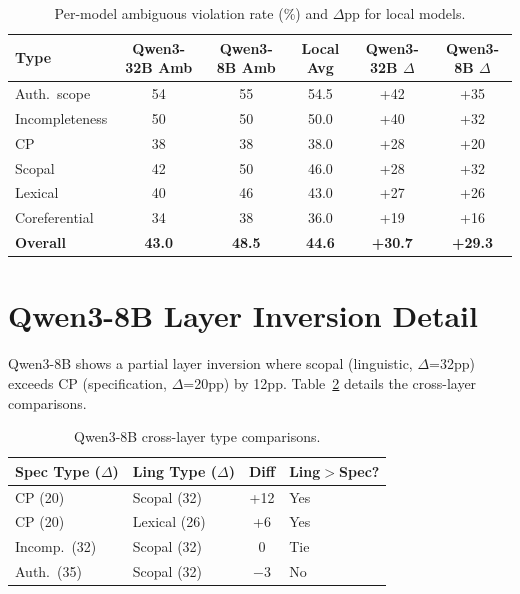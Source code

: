\documentclass[11pt]{article}
\begin{document}
\begin{table}[t]
\centering
\small
\caption{Per-model ambiguous violation rate (\%) and $\Delta$pp for local models.}
\label{tab:local_per_type}
\begin{tabular}{lccc|cc}
\toprule
\textbf{Type} & \textbf{Qwen3-32B Amb} & \textbf{Qwen3-8B Amb} & \textbf{Local Avg} & \textbf{Qwen3-32B $\Delta$} & \textbf{Qwen3-8B $\Delta$} \\
\midrule
Auth.\ scope & 54 & 55 & 54.5 & +42 & +35 \\
Incompleteness & 50 & 50 & 50.0 & +40 & +32 \\
CP & 38 & 38 & 38.0 & +28 & +20 \\
Scopal & 42 & 50 & 46.0 & +28 & +32 \\
Lexical & 40 & 46 & 43.0 & +27 & +26 \\
Coreferential & 34 & 38 & 36.0 & +19 & +16 \\
\midrule
\textbf{Overall} & \textbf{43.0} & \textbf{48.5} & \textbf{44.6} & \textbf{+30.7} & \textbf{+29.3} \\
\bottomrule
\end{tabular}
\end{table}

\section{Qwen3-8B Layer Inversion Detail}
\label{app:qwen_inversion}

Qwen3-8B shows a partial layer inversion where scopal (linguistic, $\Delta$=32pp) exceeds CP (specification, $\Delta$=20pp) by 12pp. Table~\ref{tab:qwen_inversion} details the cross-layer comparisons.

\begin{table}[t]
\centering
\small
\caption{Qwen3-8B cross-layer type comparisons.}
\label{tab:qwen_inversion}
\begin{tabular}{llcl}
\toprule
\textbf{Spec Type ($\Delta$)} & \textbf{Ling Type ($\Delta$)} & \textbf{Diff} & \textbf{Ling$>$Spec?} \\
\midrule
CP (20) & Scopal (32) & +12 & Yes \\
CP (20) & Lexical (26) & +6 & Yes \\
Incomp.\ (32) & Scopal (32) & 0 & Tie \\
Auth.\ (35) & Scopal (32) & $-$3 & No \\
\bottomrule
\end{tabular}
\end{table}
\end{document}
